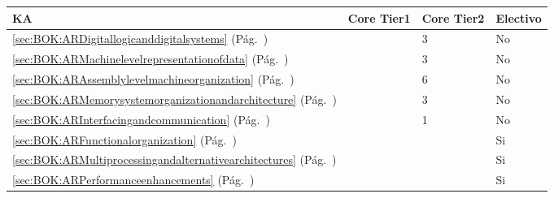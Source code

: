 \begin{center}
\begin{tabularx}{\textwidth}{|X|p{1cm}|p{1cm}|p{1.4cm}|}\hline
\textbf{\acf{KA}} & \textbf{Core Tier1} & \textbf{Core Tier2} & \textbf{Electivo} \\ \hline
\ref{sec:BOK:ARDigitallogicanddigitalsystems} \htmlref{\ARDigitallogicanddigitalsystems}{sec:BOK:ARDigitallogicanddigitalsystems}\xspace (Pág.~\pageref{sec:BOK:ARDigitallogicanddigitalsystems}) & ~ & 3 & No \\ \hline
\ref{sec:BOK:ARMachinelevelrepresentationofdata} \htmlref{\ARMachinelevelrepresentationofdata}{sec:BOK:ARMachinelevelrepresentationofdata}\xspace (Pág.~\pageref{sec:BOK:ARMachinelevelrepresentationofdata}) & ~ & 3 & No \\ \hline
\ref{sec:BOK:ARAssemblylevelmachineorganization} \htmlref{\ARAssemblylevelmachineorganization}{sec:BOK:ARAssemblylevelmachineorganization}\xspace (Pág.~\pageref{sec:BOK:ARAssemblylevelmachineorganization}) & ~ & 6 & No \\ \hline
\ref{sec:BOK:ARMemorysystemorganizationandarchitecture} \htmlref{\ARMemorysystemorganizationandarchitecture}{sec:BOK:ARMemorysystemorganizationandarchitecture}\xspace (Pág.~\pageref{sec:BOK:ARMemorysystemorganizationandarchitecture}) & ~ & 3 & No \\ \hline
\ref{sec:BOK:ARInterfacingandcommunication} \htmlref{\ARInterfacingandcommunication}{sec:BOK:ARInterfacingandcommunication}\xspace (Pág.~\pageref{sec:BOK:ARInterfacingandcommunication}) & ~ & 1 & No \\ \hline
\ref{sec:BOK:ARFunctionalorganization} \htmlref{\ARFunctionalorganization}{sec:BOK:ARFunctionalorganization}\xspace (Pág.~\pageref{sec:BOK:ARFunctionalorganization}) & ~ & ~ & Si \\ \hline
\ref{sec:BOK:ARMultiprocessingandalternativearchitectures} \htmlref{\ARMultiprocessingandalternativearchitectures}{sec:BOK:ARMultiprocessingandalternativearchitectures}\xspace (Pág.~\pageref{sec:BOK:ARMultiprocessingandalternativearchitectures}) & ~ & ~ & Si \\ \hline
\ref{sec:BOK:ARPerformanceenhancements} \htmlref{\ARPerformanceenhancements}{sec:BOK:ARPerformanceenhancements}\xspace (Pág.~\pageref{sec:BOK:ARPerformanceenhancements}) & ~ & ~ & Si \\ \hline
\end{tabularx}
\end{center}
